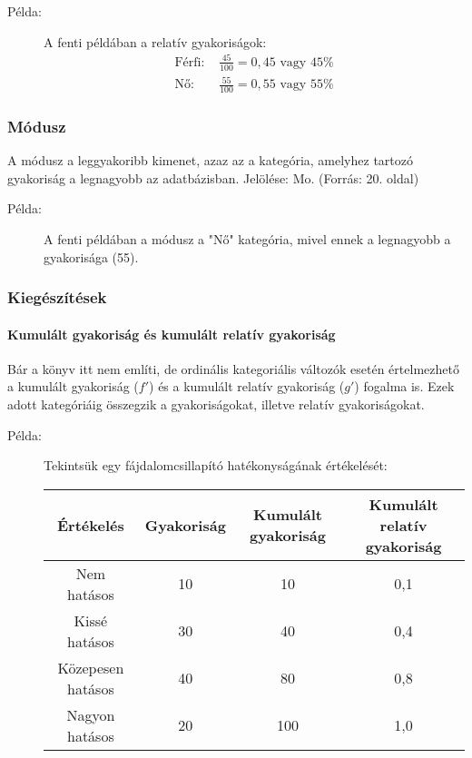 \documentclass[a4paper,12pt]{article}
\begin{document}
\begin{description}
\item[Példa:] A fenti példában a relatív gyakoriságok:
\begin{align*}
\text{Férfi: } & \frac{45}{100} = 0,45 \text{ vagy } 45\% \\
\text{Nő: } & \frac{55}{100} = 0,55 \text{ vagy } 55\%
\end{align*}
\end{description}

\subsubsection{Módusz}
A módusz a leggyakoribb kimenet, azaz az a kategória, amelyhez tartozó gyakoriság a legnagyobb az adatbázisban. Jelölése: Mo.
(Forrás: 20. oldal)

\begin{description}
\item[Példa:] A fenti példában a módusz a "Nő" kategória, mivel ennek a legnagyobb a gyakorisága (55).
\end{description}

\subsubsection{Kiegészítések}

\paragraph{Kumulált gyakoriság és kumulált relatív gyakoriság}
Bár a könyv itt nem említi, de ordinális kategoriális változók esetén értelmezhető a kumulált gyakoriság ($f'$) és a kumulált relatív gyakoriság ($g'$) fogalma is. Ezek adott kategóriáig összegzik a gyakoriságokat, illetve relatív gyakoriságokat.

\begin{description}
\item[Példa:] Tekintsük egy fájdalomcsillapító hatékonyságának értékelését:
\begin{center}
\begin{tabular}{|c|c|c|c|}
\hline
Értékelés & Gyakoriság & Kumulált gyakoriság & Kumulált relatív gyakoriság \\
\hline
Nem hatásos & 10 & 10 & 0,1 \\
Kissé hatásos & 30 & 40 & 0,4 \\
Közepesen hatásos & 40 & 80 & 0,8 \\
Nagyon hatásos & 20 & 100 & 1,0 \\
\hline
\end{tabular}
\end{center}
\end{description}
\end{document}
